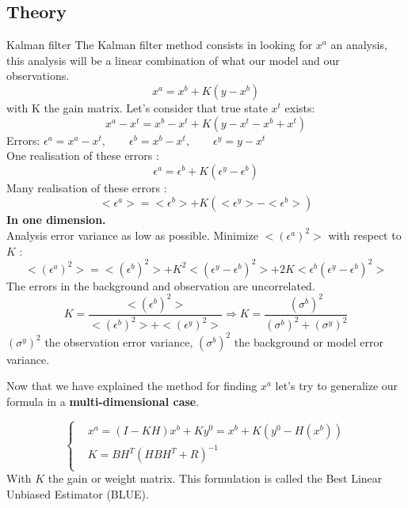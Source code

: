 \subsection{Theory}
\begin{frame}[allowframebreaks]{Kalman filter}
    The Kalman filter method consists in looking for $x^a$ an analysis, this analysis will be a linear combination of what our model and our observations.
    \begin{equation}
    	x^a=x^b+K(y-x^b)
    	\label{eq1}
    \end{equation}
    with K the gain matrix.
    \newline Let’s consider that true state $x^t$ exists:
    \begin{equation}
    	x^a-x^t=x^b-x^t+K(y-x^t-x^b+x^t)
    \end{equation}
	Errors: \qquad $\epsilon^a=x^a-x^t,\qquad \epsilon^b=x^b-x^t, \qquad \epsilon^y=y-x^t$ \\
    One realisation of these errors :
    \begin{equation}
    	\epsilon^a=\epsilon^b+K(\epsilon^y-\epsilon^b)
    \end{equation}
    Many realisation of these errors :
    \begin{equation}
    	<\epsilon^a>=<\epsilon^b>+K(<\epsilon^y>-<\epsilon^b>)
    \end{equation}
    \newpage
    \textbf{In one dimension.} \\
    Analysis error variance as low as possible.
    \newline Minimize $<(\epsilon^a)^2>$ with respect to $K$ :
    $$<(\epsilon^a)^2>=<(\epsilon^b)^2>+K^2<(\epsilon^y-\epsilon^b)^2>+2K<\epsilon^b(\epsilon^y-\epsilon^b)^2>$$
    The errors in the background and observation are uncorrelated.
    $$K=\frac{<(\epsilon^b)^2>}{<(\epsilon^b)^2>+<(\epsilon^y)^2>} \Rightarrow K=\frac{(\sigma^b)^2}{(\sigma^b)^2+(\sigma^y)^2} $$
    $(\sigma^y)^2$ the observation error variance, \newline $(\sigma^b)^2$ the background or model error variance.

	\newpage
    Now that we have explained the method for finding $x^a$ let's try to generalize our formula in a \textbf{multi-dimensional case}.

    $$\left\{\begin{aligned}
  &x^a=(I-KH)x^b+Ky^0=x^b+K(y^0-H(x^b)) \\
        &K=BH^T(HBH^T+R)^{-1} \\
 \end{aligned}\right.$$
    With $K$ the gain or weight matrix.
    This formulation is called the Best Linear Unbiased Estimator (BLUE).
    \begin{figure}
    \end{figure}
\end{frame}
